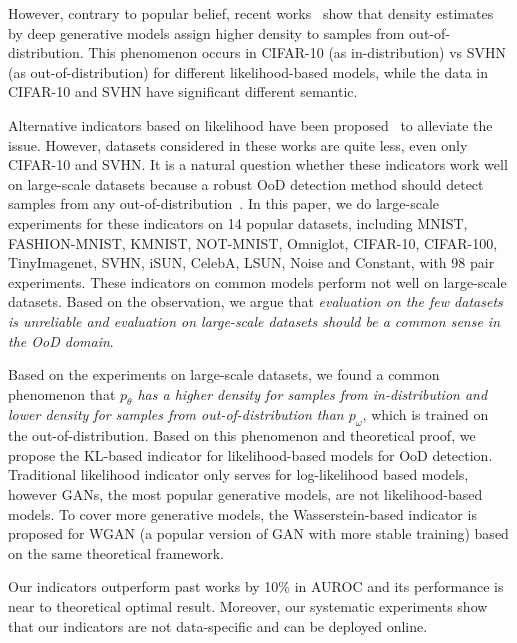 \documentclass[letterpaper]{article} %
\begin{document}
However, contrary to popular belief, recent works~\cite{nalisnick2019do,choi2018waic,hendrycks2018deep} show that density estimates by deep generative models assign higher density to samples from out-of-distribution. This phenomenon occurs in CIFAR-10 (as in-distribution) vs SVHN (as out-of-distribution) for different likelihood-based models, while the data in CIFAR-10 and SVHN have significant different semantic. 

Alternative indicators based on likelihood have been proposed~\cite{serra2019input,song2017pixeldefend,choi2018waic,ren2019likelihood,song2019unsupervised,che2019deep} to alleviate the issue. However, datasets considered in these works are quite less, even only CIFAR-10 and SVHN. It is a natural question whether these indicators work well on large-scale datasets because a robust OoD detection method should detect samples from any out-of-distribution~\cite{chen2020robust}. In this paper, we do large-scale experiments for these indicators on 14 popular datasets, including MNIST, FASHION-MNIST, KMNIST, NOT-MNIST, Omniglot, CIFAR-10, CIFAR-100, TinyImagenet, SVHN, iSUN, CelebA, LSUN, Noise and Constant, with 98 pair experiments. These indicators on common models perform not well on large-scale datasets. Based on the observation, we argue that \textit{evaluation on the few datasets is unreliable and evaluation on large-scale datasets should be a common sense in the OoD domain}. 

Based on the experiments on large-scale datasets, we found a common phenomenon that \textit{$p_\theta$ has a higher density for samples from in-distribution and lower density for samples from out-of-distribution than $p_\omega$}, which is trained on the out-of-distribution. 
Based on this phenomenon and theoretical proof, we propose the KL-based indicator for likelihood-based models for OoD detection. Traditional likelihood indicator only serves for log-likelihood based models, however GANs, the most popular generative models, are not likelihood-based models. To cover more generative models, the Wasserstein-based indicator is proposed for WGAN (a popular version of GAN with more stable training) based on the same theoretical framework. 

Our indicators outperform past works by 10\% in AUROC and its performance is near to theoretical optimal result. Moreover, our systematic experiments show that our indicators are not data-specific and can be deployed online. 
\end{document}
